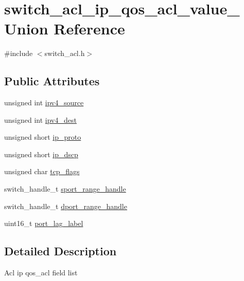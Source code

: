 \hypertarget{unionswitch__acl__ip__qos__acl__value__}{\section{switch\+\_\+acl\+\_\+ip\+\_\+qos\+\_\+acl\+\_\+value\+\_\+ Union Reference}
\label{unionswitch__acl__ip__qos__acl__value__}
}


{\ttfamily \#include $<$switch\+\_\+acl.\+h$>$}

\subsection*{Public Attributes}
\begin{DoxyCompactItemize}
\item 
unsigned int \hyperlink{unionswitch__acl__ip__qos__acl__value___aa90ed8fe753e239154c4d1216978c17b}{ipv4\+\_\+source}
\item 
unsigned int \hyperlink{unionswitch__acl__ip__qos__acl__value___a489767e3e9e077942d16421e00c97caf}{ipv4\+\_\+dest}
\item 
unsigned short \hyperlink{unionswitch__acl__ip__qos__acl__value___a09931ba4802c3b522d80711eb7ab5db3}{ip\+\_\+proto}
\item 
unsigned short \hyperlink{unionswitch__acl__ip__qos__acl__value___abf1a9e6da2a37b7738b06251584ddc6f}{ip\+\_\+dscp}
\item 
unsigned char \hyperlink{unionswitch__acl__ip__qos__acl__value___a0e92623f12368a641dcc3df025dfa0d3}{tcp\+\_\+flags}
\item 
switch\+\_\+handle\+\_\+t \hyperlink{unionswitch__acl__ip__qos__acl__value___a4c797914cb853b341f70ce0c8d8941ec}{sport\+\_\+range\+\_\+handle}
\item 
switch\+\_\+handle\+\_\+t \hyperlink{unionswitch__acl__ip__qos__acl__value___a175d6ddbfb6ee2bb9c454e40276f30fb}{dport\+\_\+range\+\_\+handle}
\item 
uint16\+\_\+t \hyperlink{unionswitch__acl__ip__qos__acl__value___a51f890c38a77d141461595b6e3718752}{port\+\_\+lag\+\_\+label}
\end{DoxyCompactItemize}


\subsection{Detailed Description}
Acl ip qos\+\_\+acl field list 

